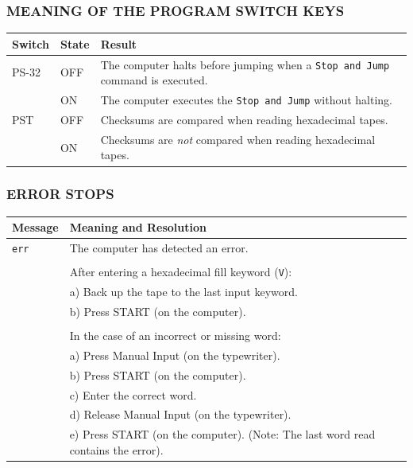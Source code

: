 \subsubsection*{MEANING OF THE PROGRAM SWITCH KEYS}
\begin{center}
\begin{tabularx}{\textwidth}{llX}
\toprule
\textbf{Switch} & \textbf{State} & \textbf{Result} \\
\midrule
\textsf{PS-32}  & \textsf{OFF}   & The computer halts before jumping when a \texttt{Stop and Jump} command is executed.\\
                & \textsf{ON}    & The computer executes the \texttt{Stop and Jump} without halting.\\
\textsf{PST}    & \textsf{OFF}   & Checksums are compared when reading hexadecimal tapes. \\
                & \textsf{ON}    & Checksums are \emph{not} compared when reading hexadecimal tapes.\\
\bottomrule
\end{tabularx}
\end{center}

\subsubsection*{ERROR STOPS}
\label{subsec:PIRerrors}
\begin{center}
\begin{tabularx}{\textwidth}{lX}
\toprule
\textbf{Message} & \textbf{Meaning and Resolution} \\
\midrule
\texttt{err}     & The computer has detected an error. \\
                 & \\
                 & After entering a hexadecimal fill keyword (\texttt{V}):\\
                 & \quad a) Back up the tape to the last input keyword. \\
                 & \quad b) Press \textsf{START} (on the computer).\\
                 & \\
                 & In the case of an incorrect or missing word:\\
                 & \quad a) Press \textsf{Manual Input} (on the typewriter). \\
                 & \quad b) Press \textsf{START} (on the computer).\\
                 & \quad c) Enter the correct word.\\
                 & \quad d) Release \textsf{Manual Input} (on the typewriter).\\
                 & \quad e) Press \textsf{START} (on the computer). (Note: The last word read contains the error).\\
\bottomrule
\end{tabularx}
\end{center}


